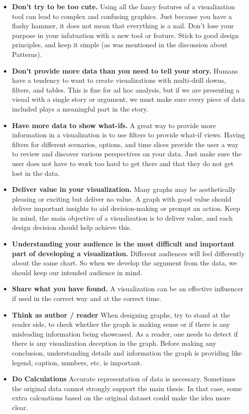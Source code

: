 \documentclass[]{book}
\begin{document}
\begin{itemize}
\item
  \textbf{Don't try to be too cute.} Using all the fancy features of a
  visualization tool can lead to complex and confusing graphics. Just
  because you have a flashy hammer, it does not mean that everything is
  a nail. Don't lose your purpose in your infatuation with a new tool or
  feature. Stick to good design principles, and keep it simple (as was
  mentioned in the discussion about Patterns).
\item
  \textbf{Don't provide more data than you need to tell your story.}
  Humans have a tendency to want to create visualizations with
  multi-drill downs, filters, and tables. This is fine for ad hoc
  analysis, but if we are presenting a visual with a single story or
  argument, we must make sure every piece of data included plays a
  meaningful part in the story.
\item
  \textbf{Have more data to show what-ifs.} A great way to provide more
  information in a visualization is to use filters to provide what-if
  views. Having filters for different scenarios, options, and time
  slices provide the user a way to review and discover various
  perspectives on your data. Just make sure the user does not have to
  work too hard to get there and that they do not get lost in the data.
\item
  \textbf{Deliver value in your visualization.} Many graphs may be
  aesthetically pleasing or exciting but deliver no value. A graph with
  good value should deliver important insights to aid decision-making or
  prompt an action. Keep in mind, the main objective of a visualization
  is to deliver value, and each design decision should help achieve
  this.
\item
  \textbf{Understanding your audience is the most difficult and
  important part of developing a visualization.} Different audiences
  will feel differently about the same chart. So when we develop the
  argument from the data, we should keep our intended audience in mind.
\item
  \textbf{Share what you have found.} A visualization can be an
  effective influencer if used in the correct way and at the correct
  time.
\item
  \textbf{Think as author / reader} When designing graphs, try to stand
  at the reader side, to check whether the graph is making sense or if
  there is any misleading information being showcased. As a reader, one
  needs to detect if there is any visualization deception in the graph.
  Before making any conclusion, understanding details and information
  the graph is providing like legend, caption, numbers, etc. is
  important.
\item
  \textbf{Do Calculations} Accurate representation of data is necessary.
  Sometimes the original data cannot strongly support the main thesis.
  In that case, some extra calcuations based on the original dataset
  could make the idea more clear.
\end{itemize}
\end{document}
